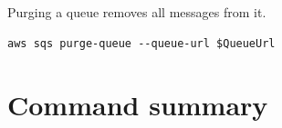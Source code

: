 Purging a queue removes all messages from it.

\begin{verbatim}
aws sqs purge-queue --queue-url $QueueUrl
\end{verbatim}



\section{Command summary}

\inputminted{powershell}{sqs_commands.ps1}



